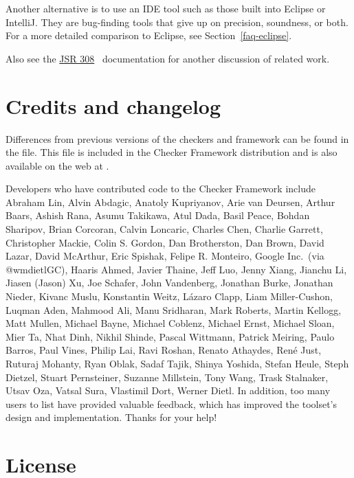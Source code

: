 Another alternative is to use an IDE tool such as those built into Eclipse
or IntelliJ\@.  They are bug-finding tools that give up on precision,
soundness, or both.
For a more detailed comparison to Eclipse, see Section~\ref{faq-eclipse}.

Also see the
\href{https://checkerframework.org/jsr308/}{JSR 308}~\cite{JSR308-2008-09-12}
documentation for another discussion of related work.


\section{Credits and changelog\label{credits}}

Differences from previous versions of the checkers and framework can be found
in the  file.  This file is included in the
Checker Framework distribution and is also available on the web at
.

Developers who have contributed code to the Checker Framework include
%
%
Abraham Lin,
Alvin Abdagic,
Anatoly Kupriyanov,
Arie van Deursen,
Arthur Baars,
Ashish Rana,
Asumu Takikawa,
Atul Dada,
Basil Peace,
Bohdan Sharipov,
Brian Corcoran,
Calvin Loncaric,
Charles Chen,
Charlie Garrett,
Christopher Mackie,
Colin S. Gordon,
Dan Brotherston,
Dan Brown,
David Lazar,
David McArthur,
Eric Spishak,
Felipe R. Monteiro,
Google Inc.\ (via @wmdietlGC),
Haaris Ahmed,
Javier Thaine,
Jeff Luo,
Jenny Xiang,
Jianchu Li,
Jiasen (Jason) Xu,
Joe Schafer,
John Vandenberg,
Jonathan Burke,
Jonathan Nieder,
Kivanc Muslu,
Konstantin Weitz,
L\'azaro Clapp,
Liam Miller-Cushon,
Luqman Aden,
Mahmood Ali,
Manu Sridharan,
Mark Roberts,
Martin Kellogg,
Matt Mullen,
Michael Bayne,
Michael Coblenz,
Michael Ernst,
Michael Sloan,
Mier Ta,
Nhat Dinh,
Nikhil Shinde,
Pascal Wittmann,
Patrick Meiring,
Paulo Barros,
Paul Vines,
Philip Lai,
Ravi Roshan,
Renato Athaydes,
Ren\'e Just,
Ruturaj Mohanty,
Ryan Oblak,
Sadaf Tajik,
Shinya Yoshida,
Stefan Heule,
Steph Dietzel,
Stuart Pernsteiner,
Suzanne Millstein,
Tony Wang,
Trask Stalnaker,
Utsav Oza,
Vatsal Sura,
Vlastimil Dort,
Werner Dietl.
%
In addition, too many users to list have provided valuable feedback, which
has improved the toolset's design and implementation.
Thanks for your help!


\section{License\label{license}}

